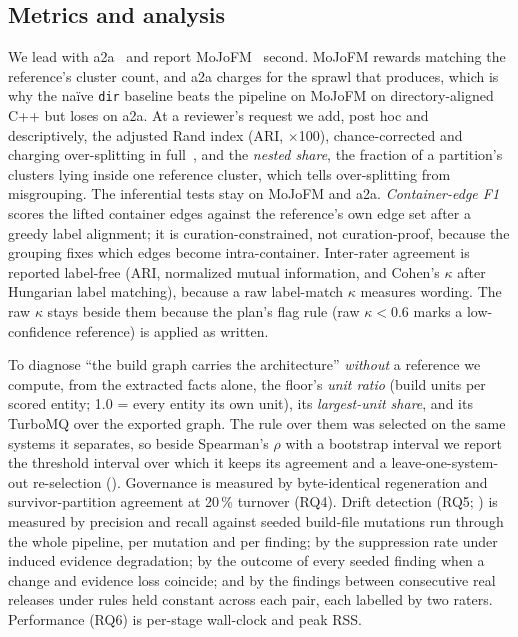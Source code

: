 \subsection{Metrics and analysis}
\label{sec:metrics}

We lead with a2a~\cite{le2015a2a} and report MoJoFM~\cite{mojofm} second. MoJoFM rewards matching
the reference's cluster count, and a2a charges for the sprawl that produces, which is why the
na\"ive \texttt{dir} baseline beats the pipeline on MoJoFM on directory-aligned C++ but loses on
a2a. At a reviewer's request we add, post hoc and descriptively, the adjusted Rand index (ARI,
$\times$100), chance-corrected and charging over-splitting in full~\cite{zhang2023sarif}, and the
\emph{nested share}, the fraction of a partition's clusters lying inside one reference cluster,
which tells over-splitting from misgrouping. The inferential tests stay on MoJoFM and a2a.
\emph{Container-edge F1} scores the lifted container edges against the reference's own edge set
after a greedy label alignment; it is curation-constrained, not curation-proof, because the
grouping fixes which edges become intra-container. Inter-rater agreement is reported label-free
(ARI, normalized mutual information, and Cohen's $\kappa$ after Hungarian label matching), because
a raw label-match $\kappa$ measures wording. The raw $\kappa$ stays beside them because the plan's
flag rule (raw $\kappa<0.6$ marks a low-confidence reference) is applied as written.

To diagnose ``the build graph carries the architecture'' \emph{without} a reference we compute,
from the extracted facts alone, the floor's \emph{unit ratio} (build units per scored entity;
1.0 = every entity its own unit), its \emph{largest-unit share}, and its TurboMQ over the exported
graph. The rule over them was selected on the same systems it separates, so beside Spearman's
$\rho$ with a bootstrap interval we report the threshold interval over which it keeps its
agreement and a leave-one-system-out re-selection (\trDiagnostic{}). Governance is measured by
byte-identical regeneration and survivor-partition agreement at 20\,\% turnover (RQ4). Drift
detection (RQ5; \trDrift{}) is measured by precision and recall against seeded build-file
mutations run through the whole pipeline, per mutation and per finding; by the suppression rate
under induced evidence degradation; by the outcome of every seeded finding when a change and
evidence loss coincide; and by the findings between consecutive real releases under rules held
constant across each pair, each labelled by two raters. Performance (RQ6) is per-stage
wall-clock and peak RSS.

